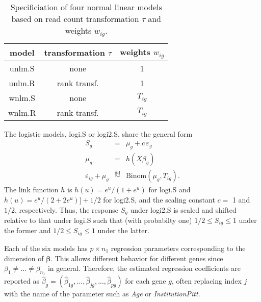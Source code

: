 \documentclass[letterpaper]{article}
\begin{document}
\begin{table}
\begin{center}
\begin{tabular}{c|cc}
model & transformation \(\tau\) & weights \(w_{ig}\) \\
\hline
unlm.S & none & 1 \\
unlm.R & rank transf. & 1 \\
wnlm.S & none & \(T_{ig}\) \\
wnlm.R & rank transf. & \(T_{ig}\) \\
\end{tabular}
\end{center}
\caption{Specificiation of four normal linear models based on read count
transformation \(\tau\) and weights \(w_{ig}\).}
\label{tab:nlm}
\end{table}

The logistic models, logi.S or logi2.S, share the general form
\begin{eqnarray}
S_g &=& \mu_g + c\, \varepsilon_g
\label{eq:logi-general}
\\
\mu_g &=& h(X \beta_g) \\
\varepsilon_{ig} + \mu_g &\overset{\mathrm{iid}}{\sim}& \mathrm{Binom}(\mu_g, T_{ig}).
\label{eq:binom-error}
\end{eqnarray}
The link function \(h\) is \(h(u) = e^u / (1 + e^u)\) for logi.S and \(h(u) =
e^u / (2 + 2e^u)] + 1/2\) for logi2.S, and the scaling constant \(c=\) 1
 and \(1/2\), respectively.  Thus, the response \(S_g\) under logi2.S is scaled and shifted relative to
that under logi.S such that (with probabilty one) \(1/2\le S_{ig}\le 1\) under the former and
\(1/2\le S_{ig}\le 1\) under the latter.

Each of the six models has \(p\times n_1\) regression parameters corresponding to the
dimension of \(\boldsymbol{\beta}\).  This allows different behavior for
different genes since \(\beta_1\neq ...\neq\beta_{n_1}\) in general.
Therefore, the estimated regression coefficients are reported as \(\hat{\beta}_g =
(\hat{\beta}_{1g},...,\hat{\beta}_{jg},...,\hat{\beta}_{pg})\) for each gene \(g\), often
replacing index \(j\) with the name of the parameter such as \emph{Age} or
\emph{InstitutionPitt}.
\end{document}
